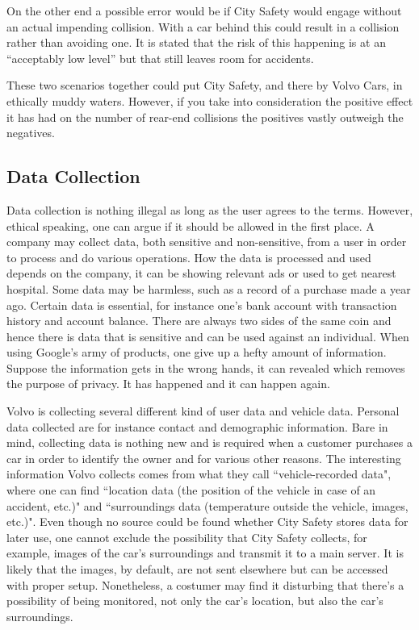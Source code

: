 \documentclass[conference]{IEEEtran}
\begin{document}
On the other end a possible error would be if City Safety would engage without an actual impending collision. With a car behind this could result in a collision rather than avoiding one. It is stated that the risk of this happening is at an ``acceptably low level'' \cite{SysDescription} but that still leaves room for accidents.

These two scenarios together could put City Safety, and there by Volvo Cars, in ethically muddy waters. However, if you take into consideration the positive effect it has had on the number of rear-end collisions \cite{CitySafety} the positives vastly outweigh the negatives.

\subsection{Data Collection}

Data collection is nothing illegal as long as the user agrees to the terms. However, ethical speaking, one can argue if it should be allowed in the first place. A company may collect data, both sensitive and non-sensitive, from a user in order to process and do various operations. How the data is processed and used depends on the company, it can be showing relevant ads or used to get nearest hospital. \cite{GoogleAds,GoogleNearby,GoogleUserData} Some data may be harmless, such as a record of a purchase made a year ago. Certain data is essential, for instance one's bank account with transaction history and account balance. There are always two sides of the same coin and hence there is data that is sensitive and can be used against an individual. When using Google's army of products, one give up a hefty amount of information. \cite{GoogleUserData} Suppose the information gets in the wrong hands, it can revealed which removes the purpose of privacy. It has happened and it can happen again. \cite{TheFappening,EdwardSnowden} 

Volvo is collecting several different kind of user data and vehicle data. Personal data collected are for instance contact and demographic information. \cite{PrivacyPolicy} Bare in mind, collecting data is nothing new and is required when a customer purchases a car in order to identify the owner and for various other reasons. The interesting information Volvo collects comes from what they call ``vehicle-recorded data", where one can find ``location data (the position of the vehicle in case of an accident, etc.)" and ``surroundings data (temperature outside the vehicle, images, etc.)". \cite{PrivacyPolicy} Even though no source could be found whether City Safety stores data for later use, one cannot exclude the possibility that City Safety collects, for example, images of the car's surroundings and transmit it to a main server. It is likely that the images, by default, are not sent elsewhere but can be accessed with proper setup. Nonetheless, a costumer may find it disturbing that there's a possibility of being monitored, not only the car's location, but also the car's surroundings.
\end{document}

